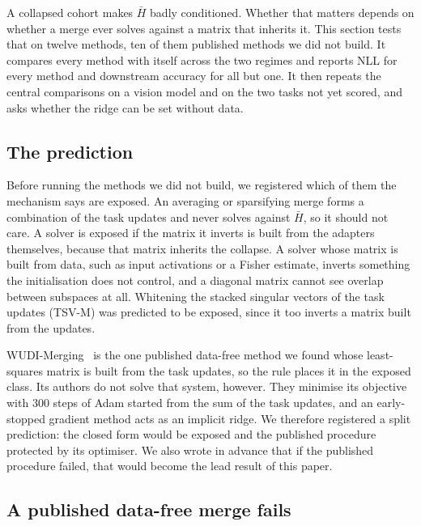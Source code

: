 A collapsed cohort makes $\bar H$ badly conditioned. Whether that matters
depends on whether a merge ever solves against a matrix that inherits it. This
section tests that on twelve methods, ten of them published methods we did not
build. It compares every method with itself across the two regimes and reports
NLL for every method and downstream accuracy for all but one. It then repeats the central comparisons on a
vision model and on the two tasks not yet scored, and asks whether the ridge
can be set without data.

\subsection{The prediction}\label{subsec:prediction}

Before running the methods we did not build, we registered which of them the
mechanism says are exposed. An averaging or sparsifying merge forms a
combination of the task updates and never solves against $\bar H$, so it
should not care. A solver is exposed if the matrix it inverts is built from
the adapters themselves, because that matrix inherits the collapse. A solver
whose matrix is built from data, such as input activations or a Fisher
estimate, inverts something the initialisation does not control, and a
diagonal matrix cannot see overlap between subspaces at all. Whitening the
stacked singular vectors of the task updates (TSV-M) was predicted to be
exposed, since it too inverts a matrix built from the updates.

WUDI-Merging~\citep{cheng2025wudi} is the one published data-free method we
found whose least-squares matrix is built from the task updates, so the rule
places it in the exposed class. Its authors do not solve that system, however.
They minimise its objective with $300$ steps of Adam started from the sum of
the task updates, and an early-stopped gradient method acts as an implicit
ridge. We therefore registered a split prediction: the closed form would be
exposed and the published procedure protected by its optimiser. We also wrote
in advance that if the published procedure failed, that would become the lead
result of this paper.

\subsection{A published data-free merge fails}\label{subsec:wudi}

